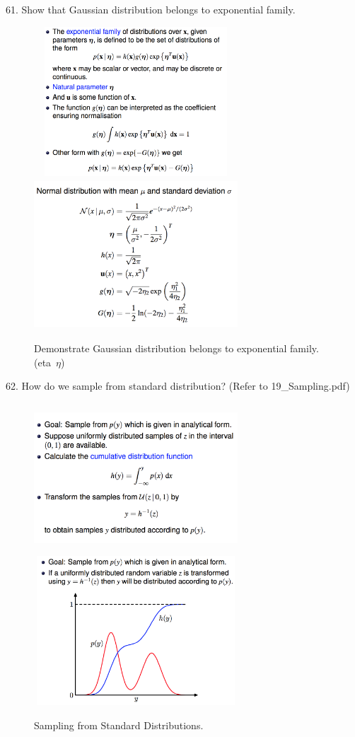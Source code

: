\documentclass[11pt,a4paper]{article}
\begin{document}
61. Show that Gaussian distribution belongs to exponential family.

\begin{figure}[H] \centering
    \includegraphics[width=3in,height=2.2in]{./figure/expfamily_1.png}
    \includegraphics[width=3in,height=2.2in]{./figure/expfamily_2.png}
    \caption{Demonstrate Gaussian distribution belongs to exponential family. (eta\ $\eta$)}
\end{figure}

62. How do we sample from standard distribution? (Refer to 19\_Sampling.pdf)
\begin{figure}[H] \centering
    \includegraphics[width=3in,height=2.2in]{./figure/standardSampling_1.png}
    \includegraphics[width=3in,height=2.2in]{./figure/standardSampling_2.png}
    \caption{Sampling from Standard Distributions.}
\end{figure}
\end{document}
